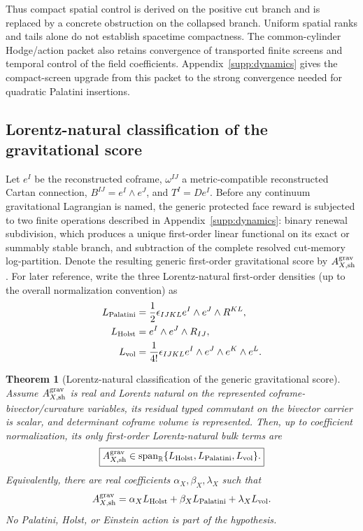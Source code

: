 \documentclass[11pt]{article}
\newtheorem{theorem}{Theorem}[section]
\theoremstyle{definition}
\theoremstyle{remark}
\newcommand{\R}{\mathbb R}
\newcommand{\Span}{\operatorname{span}}
\begin{document}
Thus compact spatial control is derived on the positive cut branch and is
replaced by a concrete obstruction on the collapsed branch.  Uniform spatial
ranks and tails alone do not establish spacetime compactness.  The
common-cylinder Hodge/action packet also retains convergence of transported
finite screens and temporal control of the field coefficients.
Appendix~\ref{supp:dynamics} gives the compact-screen upgrade from this
packet to the strong convergence needed for quadratic Palatini insertions.

\subsection{Lorentz-natural classification of the gravitational score}

Let $e^I$ be the reconstructed coframe, $\omega^{IJ}$ a metric-compatible
reconstructed Cartan connection, $B^{IJ}=e^I\wedge e^J$, and $T^I=De^I$.
Before any continuum gravitational Lagrangian is named, the generic protected
face reward is subjected to two finite operations described in
Appendix~\ref{supp:dynamics}: binary renewal subdivision, which produces a unique
first-order linear functional on its exact or summably stable branch, and
subtraction of the complete resolved cut-memory log-partition.  Denote the
resulting generic first-order gravitational score by $A^{\rm grav}_{X,\rm sh}$.
For later reference, write the three Lorentz-natural first-order densities (up
to the overall normalization convention) as
\begin{align}
 L_{\rm Palatini}
 &=\frac12\epsilon_{IJKL}e^I\wedge e^J\wedge R^{KL},\\
 L_{\rm Holst}
 &=e^I\wedge e^J\wedge R_{IJ},\\
 L_{\rm vol}
 &=\frac1{4!}\epsilon_{IJKL}
 e^I\wedge e^J\wedge e^K\wedge e^L.
 \label{eq:main-phv-densities}
\end{align}

\begin{theorem}[Lorentz-natural classification of the generic gravitational score]
\label{thm:main-gravitational-classification}
Assume $A^{\rm grav}_{X,\rm sh}$ is real and Lorentz natural on the represented
coframe-bivector/curvature variables, its residual typed commutant on the
bivector carrier is scalar, and determinant coframe volume is represented.
Then, up to coefficient normalization, its only first-order Lorentz-natural
bulk terms are
\begin{equation}
 \boxed{
 A^{\rm grav}_{X,\rm sh}
 \in\Span_{\R}\{L_{\rm Holst},L_{\rm Palatini},L_{\rm vol}\}.}
 \label{eq:main-phv-classification}
\end{equation}
Equivalently, there are real coefficients $\alpha_X,\beta_X,\lambda_X$ such that
\begin{equation}
 A^{\rm grav}_{X,\rm sh}
 =\alpha_XL_{\rm Holst}+\beta_XL_{\rm Palatini}+\lambda_XL_{\rm vol}.
 \label{eq:main-phv-coefficients}
\end{equation}
No Palatini, Holst, or Einstein action is part of the hypothesis.
\end{theorem}
\end{document}
